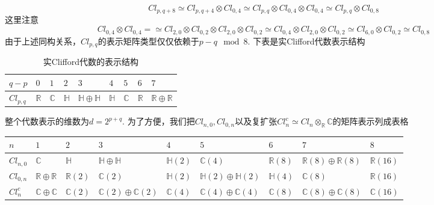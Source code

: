 \documentclass[a4paper]{article}
\numberwithin{equation}{subsection}
\begin{document}
\begin{equation}
    Cl_{p,q+8}\simeq Cl_{p,q+4}\otimes Cl_{0,4}\simeq Cl_{p,q}\otimes Cl_{0,4}\otimes Cl_{0,4}\simeq Cl_{p,q}\otimes Cl_{0,8}
\end{equation}
这里注意
\begin{equation}
    Cl_{0,4}\otimes Cl_{0,4}=\simeq Cl_{2,0}\otimes Cl_{0,2}\otimes Cl_{2,0}\otimes Cl_{0,2}\simeq Cl_{0,4}\otimes Cl_{2,0}\otimes Cl_{0,2}\simeq Cl_{6,0}\otimes Cl_{0,2}\simeq Cl_{0,8}
\end{equation}
由于上述同构关系，$Cl_{p,q}$的表示矩阵类型仅仅依赖于$p-q \mod 8$. 下表是实Clifford代数表示结构

\begin{table}[h]
    \centering
    \begin{tabular}{|p{1cm}|p{1cm}|p{1cm}|p{1cm}|p{1cm}|p{1cm}|p{1cm}|p{1cm}|p{1cm}|}
    \hline
    $q-p$    & $0$          & $1$          & $2$          & $3$                          & $4$          & $5$          & $6$          & $7$                          \\ \hline
    $Cl_{p,q}$ & $\mathbb{R}$ & $\mathbb{C}$ & $\mathbb{H}$ & $\mathbb{H}\oplus\mathbb{H}$ & $\mathbb{H}$ & $\mathbb{C}$ & $\mathbb{R}$ & $\mathbb{R}\oplus\mathbb{R}$ \\ \hline
    \end{tabular}
    \caption{实Clifford代数的表示结构}
\end{table}

整个代数表示的维数为$d=2^{p+q}$. 为了方便，我们把$Cl_{n,0},Cl_{0,n}$以及复扩张$Cl_n^c\simeq Cl_n\otimes_{\mathbb{R}}\mathbb{C}$的矩阵表示列成表格

\begin{table}[h]
    \centering
    \begin{tabular}{|l|l|l|l|l|l|l|l|l|}
        \hline
        $n$          & $1$                          & $2$                            & $3$                                & $4$             & $5$                                & $6$             & $7$                                & $8$                               \\ \hline
        $Cl_{n,0}$ & $\mathbb{C}$                 & $\mathbb{H}$                   & $\mathbb{H}\oplus\mathbb{H}$       & $\mathbb{H}(2)$ & $\mathbb{C}(4)$                    & $\mathbb{R}(8)$ & $\mathbb{R}(8)\oplus\mathbb{R}(8)$ & $\mathbb{R}(16)$ \\ \hline
        $Cl_{0,n}$ & $\mathbb{R}\oplus\mathbb{R}$ & $\mathbb{R}(2)$ & $\mathbb{C}(2)$                    & $\mathbb{H}(2)$ & $\mathbb{H}(2)\oplus\mathbb{H}(2)$ & $\mathbb{H}(4)$ & $\mathbb{C}(8)$                    & $\mathbb{R}(16)$                  \\ \hline
        $Cl_n^c$   & $\mathbb{C}\oplus\mathbb{C}$ & $\mathbb{C}(2)$                & $\mathbb{C}(2)\oplus\mathbb{C}(2)$ & $\mathbb{C}(4)$ & $\mathbb{C}(4)\oplus\mathbb{C}(4)$ & $\mathbb{C}(8)$ & $\mathbb{C}(8)\oplus\mathbb{C}(8)$ & $\mathbb{C}(16)$                  \\ \hline
    \end{tabular}
\end{table}
\end{document}
